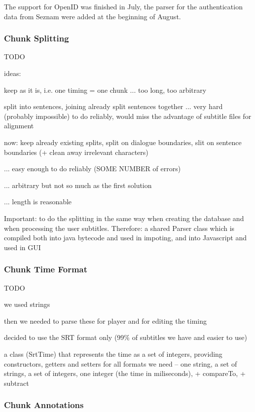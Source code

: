 The support for OpenID was finished in July, the parser for the authentication data from Seznam were added at the beginning of August.

\subsubsection{Chunk Splitting}

TODO

ideas:

keep as it is, i.e. one timing = one chunk ... too long, too arbitrary

split into sentences, joining already split sentences together ... very hard (probably impossible) to do reliably, would miss the advantage of subtitle files for alignment

now: keep already existing splits, split on dialogue boundaries, slit on sentence boundaries (+ clean away irrelevant characters)

... easy enough to do reliably (SOME NUMBER of errors)

... arbitrary but not so much as the first solution

... length is reasonable

Important: to do the splitting in the same way when creating the database and when processing the user subtitles.
Therefore: a shared Parser class which is compiled both into java bytecode and used in impoting, and into Javascript and used in GUI

\subsubsection{Chunk Time Format}

TODO

we used strings

then we needed to parse these for player and for editing the timing

decided to use the SRT format only (99\% of subtitles we have and easier to use)

a class (SrtTime) that represents the time as a set of integers, providing constructors, getters and setters for all formats we need -- one string, a set of strings, a set of integers, one integer (the time in miliseconds), + compareTo, + subtract

\subsubsection{Chunk Annotations}


